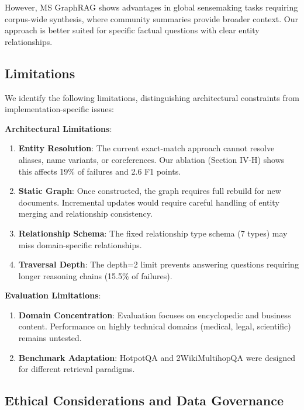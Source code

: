 \documentclass[conference]{IEEEtran}
\begin{document}
However, MS GraphRAG shows advantages in global sensemaking tasks requiring corpus-wide synthesis, where community summaries provide broader context. Our approach is better suited for specific factual questions with clear entity relationships.

\subsection{Limitations}

We identify the following limitations, distinguishing architectural constraints from implementation-specific issues:

\textbf{Architectural Limitations}:

\begin{enumerate}
    \item \textbf{Entity Resolution}: The current exact-match approach cannot resolve aliases, name variants, or coreferences. Our ablation (Section IV-H) shows this affects 19\% of failures and 2.6 F1 points.
    
    \item \textbf{Static Graph}: Once constructed, the graph requires full rebuild for new documents. Incremental updates would require careful handling of entity merging and relationship consistency.
    
    \item \textbf{Relationship Schema}: The fixed relationship type schema (7 types) may miss domain-specific relationships.
    
    \item \textbf{Traversal Depth}: The depth=2 limit prevents answering questions requiring longer reasoning chains (15.5\% of failures).
\end{enumerate}

\textbf{Evaluation Limitations}:

\begin{enumerate}
    \item[5.] \textbf{Domain Concentration}: Evaluation focuses on encyclopedic and business content. Performance on highly technical domains (medical, legal, scientific) remains untested.
    
    \item[6.] \textbf{Benchmark Adaptation}: HotpotQA and 2WikiMultihopQA were designed for different retrieval paradigms.
\end{enumerate}

\subsection{Ethical Considerations and Data Governance}
\end{document}
